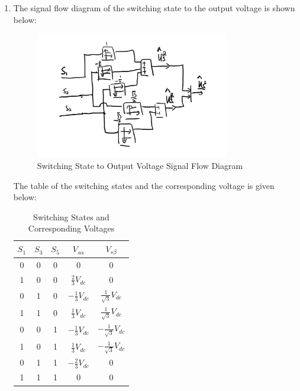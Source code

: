 \documentclass[12pt,a4paper, openany]{book}
\begin{document}
\begin{enumerate}
    \item The signal flow diagram of the switching state to the output voltage is shown below:
    \begin{figure}[H]
        \centering
        \includegraphics[width=0.8\textwidth]{figures/switching_state_to_output_voltage.png}
        \caption{Switching State to Output Voltage Signal Flow Diagram}
        \label{fig:switching_state_to_output_voltage}
    \end{figure}

    The table of the switching states and the corresponding voltage is given below:
    \begin{table}[H]
        \centering
        \begin{tabular}{|c|c|c|c|c|}
            \hline
            $S_1$ & $S_3$ & $S_5$ & $V_{s\alpha}$ & $V_{s\beta}$ \\
            \hline 
            0 & 0 & 0 & 0 & 0 \\
            1 & 0 & 0 & $\frac{2}{3}V_{dc}$ & 0 \\
            0 & 1 & 0 & $-\frac{1}{3}V_{dc}$ & $\frac{1}{\sqrt{3}}V_{dc}$ \\
            1 & 1 & 0 & $\frac{1}{3}V_{dc}$ & $\frac{1}{\sqrt{3}}V_{dc}$ \\
            0 & 0 & 1 & $-\frac{1}{3}V_{dc}$ & $-\frac{1}{\sqrt{3}}V_{dc}$ \\
            1 & 0 & 1 & $\frac{1}{3}V_{dc}$ & $-\frac{1}{\sqrt{3}}V_{dc}$ \\
            0 & 1 & 1 & $-\frac{2}{3}V_{dc}$ & 0 \\
            1 & 1 & 1 & 0 & 0 \\    
            \hline
        \end{tabular}
        \caption{Switching States and Corresponding Voltages}
        \label{tab:switching_states}
    \end{table}
    

\end{enumerate}
\end{document}
